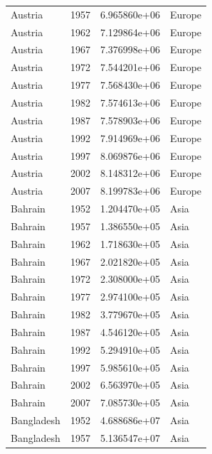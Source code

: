 \documentclass[
  letterpaper,
  DIV=11,
  numbers=noendperiod]{scrreprt}
\begin{document}
\begin{tcolorbox}
\begin{tabular}{lrrl}
Austria                  &  1957 &  6.965860e+06 &    Europe \\
Austria                  &  1962 &  7.129864e+06 &    Europe \\
Austria                  &  1967 &  7.376998e+06 &    Europe \\
Austria                  &  1972 &  7.544201e+06 &    Europe \\
Austria                  &  1977 &  7.568430e+06 &    Europe \\
Austria                  &  1982 &  7.574613e+06 &    Europe \\
Austria                  &  1987 &  7.578903e+06 &    Europe \\
Austria                  &  1992 &  7.914969e+06 &    Europe \\
Austria                  &  1997 &  8.069876e+06 &    Europe \\
Austria                  &  2002 &  8.148312e+06 &    Europe \\
Austria                  &  2007 &  8.199783e+06 &    Europe \\
Bahrain                  &  1952 &  1.204470e+05 &      Asia \\
Bahrain                  &  1957 &  1.386550e+05 &      Asia \\
Bahrain                  &  1962 &  1.718630e+05 &      Asia \\
Bahrain                  &  1967 &  2.021820e+05 &      Asia \\
Bahrain                  &  1972 &  2.308000e+05 &      Asia \\
Bahrain                  &  1977 &  2.974100e+05 &      Asia \\
Bahrain                  &  1982 &  3.779670e+05 &      Asia \\
Bahrain                  &  1987 &  4.546120e+05 &      Asia \\
Bahrain                  &  1992 &  5.294910e+05 &      Asia \\
Bahrain                  &  1997 &  5.985610e+05 &      Asia \\
Bahrain                  &  2002 &  6.563970e+05 &      Asia \\
Bahrain                  &  2007 &  7.085730e+05 &      Asia \\
Bangladesh               &  1952 &  4.688686e+07 &      Asia \\
Bangladesh               &  1957 &  5.136547e+07 &      Asia \\

\end{tabular}
\end{tcolorbox}
\end{document}
